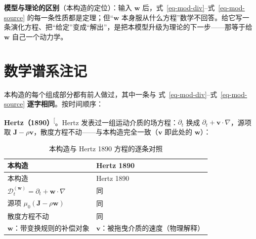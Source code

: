 \documentclass[
  chinese,
  a4paper,
  UTF8,
  12pt,
  oneside,
  openany]{ctexbook}
\theoremstyle{plain}
\theoremstyle{plain}
\theoremstyle{plain}
\theoremstyle{definition}
\theoremstyle{plain}
\theoremstyle{plain}
\theoremstyle{remark}
\begin{document}
\textbf{模型与理论的区别}（本构造的定位）：输入 \(\mathbf{w}\)
后，式~\ref{eq-mod-div}--式~\ref{eq-mod-source}
的每一条性质都是定理；但``\(\mathbf{w}\)
本身服从什么方程''数学不回答。给它写一条演化方程、把``给定''变成``解出''，是把本模型升级为理论的下一步------那等于给
\(\mathbf{w}\) 自己一个动力学。

\section{数学谱系注记}\label{sec-gal-lineage}

本构造的每个组成部分都有前人做过，其中一条与
式~\ref{eq-mod-div}--式~\ref{eq-mod-source}
\textbf{逐字相同}。按时间顺序：

\textbf{Hertz（1890）}\textsuperscript{{[}\citeproc{ref-hertz1890}{9}{]}}。Hertz
发表过一组运动介质的场方程：\(\partial_t\) 换成
\(\partial_t+\mathbf{v}\cdot\nabla\)，源项取
\(\mathbf{J}-\rho\mathbf{v}\)，散度方程不动------与本构造完全一致（\(\mathbf{v}\)
即此处的 \(\mathbf{w}\)）：

\begin{longtable}[]{@{}
  >{\raggedright\arraybackslash}p{}
  >{\raggedright\arraybackslash}p{}@{}}
\caption{本构造与 Hertz 1890
方程的逐条对照}\label{tbl-hertz}\tabularnewline
\toprule\noalign{}
\begin{minipage}[b]{\linewidth}\raggedright
本构造
\end{minipage} & \begin{minipage}[b]{\linewidth}\raggedright
Hertz 1890
\end{minipage} \\
\midrule\noalign{}
\endfirsthead
\toprule\noalign{}
\begin{minipage}[b]{\linewidth}\raggedright
本构造
\end{minipage} & \begin{minipage}[b]{\linewidth}\raggedright
Hertz 1890
\end{minipage} \\
\midrule\noalign{}
\endhead
\bottomrule\noalign{}
\endlastfoot
\(\mathcal{D}_t^{(\mathbf{w})} = \partial_t+\mathbf{w}\cdot\nabla\) &
同 \\
源项 \(\mu_0(\mathbf{J}-\rho\mathbf{w})\) & 同 \\
散度方程不动 & 同 \\
\(\mathbf{w}\)：带变换规则的补偿对象 &
\(\mathbf{v}\)：被拖曳介质的速度（物理解释） \\
\end{longtable}
\end{document}
